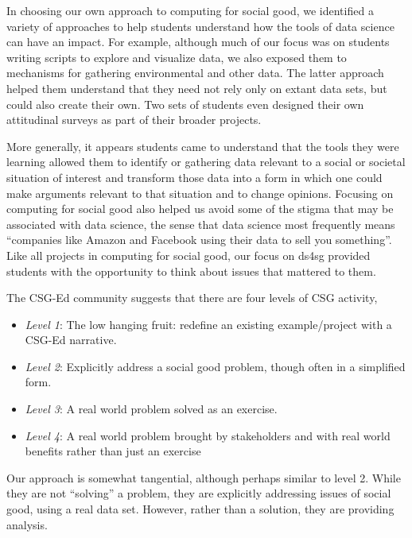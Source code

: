 In choosing our own approach to computing for social good, we
identified a variety of approaches to help students understand how
the tools of data science can have an impact.  For example, although
much of our focus was on students writing scripts to explore and
visualize data, we also exposed them to mechanisms for gathering
environmental and other data.  The latter approach helped them
understand that they need not rely only on extant data sets, but
could also create their own.  Two sets of students even designed
their own attitudinal surveys as part of their broader projects.

More generally, it appears students came to understand that the
tools they were learning allowed them to identify or gathering data
relevant to a social or societal situation of interest and transform
those data into a form in which one could make arguments relevant
to that situation and to change opinions.  Focusing on computing
for social good also helped us avoid some of the stigma that may
be associated with data science, the sense that data science most
frequently means ``companies like Amazon and Facebook using their
data to sell you something''.  Like all projects in computing for
social good, our focus on ds4sg provided students with the opportunity
to think about issues that mattered to them.

The CSG-Ed community suggests that there are four levels of CSG
activity,\cite{Goldweber2018}

\begin{itemize}
\item \textit{Level 1}: The low hanging fruit: redefine an existing
  example/project with a CSG-Ed narrative.
\item \textit{Level 2}: Explicitly address a social good problem,
  though often in a simplified form.
\item \textit{Level 3}: A real world problem solved as an
  exercise.
\item \textit{Level 4}: A real world problem brought by stakeholders
  and with real world benefits rather than just an exercise
\end{itemize}

Our approach is somewhat tangential, although perhaps similar to
level 2.  While they are not ``solving'' a problem, they are
explicitly addressing issues of social good, using a real data set.
However, rather than a solution, they are providing analysis.



